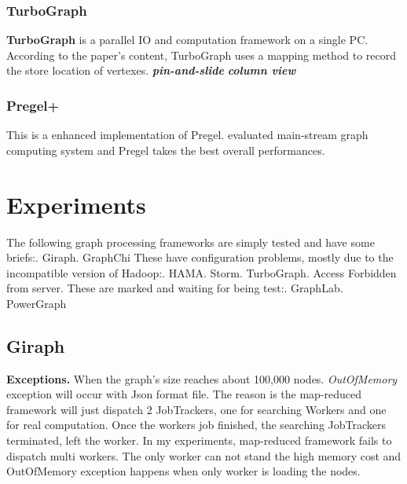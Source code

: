 \documentclass{article}
\begin{document}
	\subsubsection{TurboGraph}
	\textbf{TurboGraph}\cite{han2013turbograph:} is a parallel IO and computation framework on a single PC. According to the paper's content, TurboGraph uses a mapping method to record the store location of vertexes.
	\newline
	\textbf{\emph{pin-and-slide}}
	\newline
	\textbf{\emph{column view}}

	\subsubsection{Pregel+}
	This is a enhanced implementation of Pregel. \cite{lu2014large-scale} evaluated main-stream graph computing system and Pregel takes the best overall performances.

	\newpage
	\section{Experiments}
	The following graph processing frameworks are simply tested and have some briefs:. Giraph. GraphChi\newline
	These have configuration problems, mostly due to the incompatible version of Hadoop:. HAMA. Storm. TurboGraph. Access Forbidden from server.\newline
	These are marked and waiting for being test:. GraphLab. PowerGraph\newline

	\subsection{Giraph}
	\textbf{Exceptions.} When the graph's size reaches about 100,000 nodes. \emph{OutOfMemory} exception will occur with Json format file. The reason is the map-reduced framework will just dispatch 2 JobTrackers, one for searching Workers and one for real computation. Once the workers job finished, the searching JobTrackers terminated, left the worker. In my experiments, map-reduced framework fails to dispatch multi workers. The only worker can not stand the high memory cost and OutOfMemory exception happens when only worker is loading the nodes.
\end{document}
